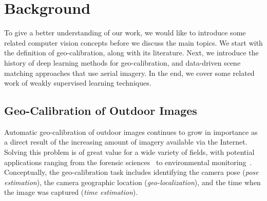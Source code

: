 \section{Background}
To give a better understanding of our work, we would like to introduce
some related computer vision concepts before we discuss the main topics.
We start with the definition of geo-calibration,
along with its literature. Next, we introduce the history of deep
learning methods for geo-calibration, and data-driven scene matching
approaches that use aerial imagery. In the end, we cover some related
work of weakly supervised learning techniques.

\subsection{Geo-Calibration of Outdoor Images}
Automatic geo-calibration of outdoor images continues to grow in
importance as a direct result of the increasing amount of imagery
available via the Internet. Solving this problem is of great value
for a wide variety of fields, with potential applications ranging from
the forensic sciences~\cite{stylianou13jane} to environmental
monitoring~\cite{zhang2012mining}. Conceptually, the geo-calibration
task includes identifying the camera pose ({\em pose estimation}),
the camera geographic location ({\em geo-localization}), and the time
when the image was captured ({\em time estimation}).

